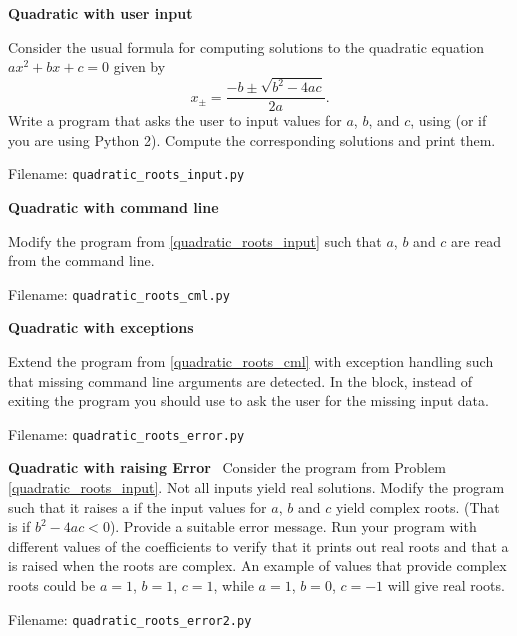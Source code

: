 
\begin{Problem}{\textbf{Quadratic with user input}} \label{quadratic_roots_input}

\noindent Consider the usual formula for computing solutions to the quadratic equation
$ax^2+bx+c=0$ given by
\begin{equation*}
    x_{\pm}=\frac{-b\pm\sqrt{b^2-4ac}}{2a}.
\end{equation*}
Write a program that asks the user to input values for $a$, $b$, and $c$, using 
(or  if you are using Python 2). Compute the corresponding solutions and print them.

Filename: \texttt{quadratic\_roots\_input.py}
\end{Problem}

\begin{Problem}{\textbf{Quadratic with command line}} \label{quadratic_roots_cml}

\noindent Modify the program from \ref{quadratic_roots_input} such that $a$, $b$ and $c$ are read from the command line.

Filename: \texttt{quadratic\_roots\_cml.py}
\end{Problem}


\begin{Problem}{\textbf{Quadratic with exceptions}}

\noindent Extend the program from \ref{quadratic_roots_cml} with exception handling such that missing command line arguments are
detected. In the  block, instead of exiting the program you should
use  to ask the user for the missing input data.

Filename: \texttt{quadratic\_roots\_error.py}
\end{Problem}

\begin{Problem}{\textbf{Quadratic with raising Error}} \label{prob43} \
Consider the program from Problem \ref{quadratic_roots_input}. Not all inputs yield real solutions.
Modify the program such that it raises a \pythoninline{ValueError} if the input values for $a$, $b$ and $c$
yield complex roots. (That is if $b^2 - 4ac < 0$). Provide a suitable error  message. Run your program with different
values of the coefficients to verify that it prints out real roots and that a \pythoninline{ValueError} is raised
when the roots are complex. An example of values that provide complex roots could be $a=1$, $b=1$, $c=1$,
while $a=1$, $b=0$, $c=-1$ will give real roots.

Filename: \texttt{quadratic\_roots\_error2.py}
\end{Problem}

